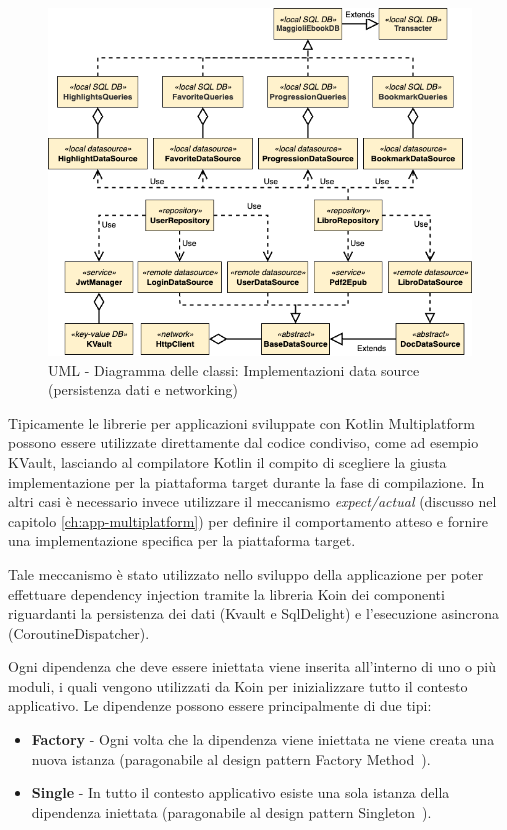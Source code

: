 \begin{figure}[H]
    \centering
    \includegraphics[width=1\textwidth]{img/uml-network-db.png}
    \caption{UML - Diagramma delle classi: Implementazioni data source (persistenza dati e networking)}
\end{figure}

Tipicamente le librerie per applicazioni sviluppate con Kotlin Multiplatform possono essere utilizzate direttamente dal codice condiviso, come ad esempio KVault, lasciando al compilatore Kotlin il compito di scegliere la giusta implementazione per la piattaforma target durante la fase di compilazione. In altri casi è necessario invece utilizzare il meccanismo \textit{expect/actual} (discusso nel capitolo \ref{ch:app-multiplatform}) per definire il comportamento atteso e fornire una implementazione specifica per la piattaforma target.

Tale meccanismo è stato utilizzato nello sviluppo della applicazione per poter effettuare dependency injection tramite la libreria Koin dei componenti riguardanti la persistenza dei dati (Kvault e SqlDelight) e l'esecuzione asincrona (CoroutineDispatcher).

Ogni dipendenza che deve essere iniettata viene inserita all'interno di uno o più moduli, i quali vengono utilizzati da Koin per inizializzare tutto il contesto applicativo. Le dipendenze possono essere principalmente di due tipi:
\begin{itemize}
    \item \textbf{Factory} - Ogni volta che la dipendenza viene iniettata ne viene creata una nuova istanza (paragonabile al design pattern Factory Method~\cite{gamma1994design}).
    \item \textbf{Single} - In tutto il contesto applicativo esiste una sola istanza della dipendenza iniettata (paragonabile al design pattern Singleton~\cite{gamma1994design}).
\end{itemize}

